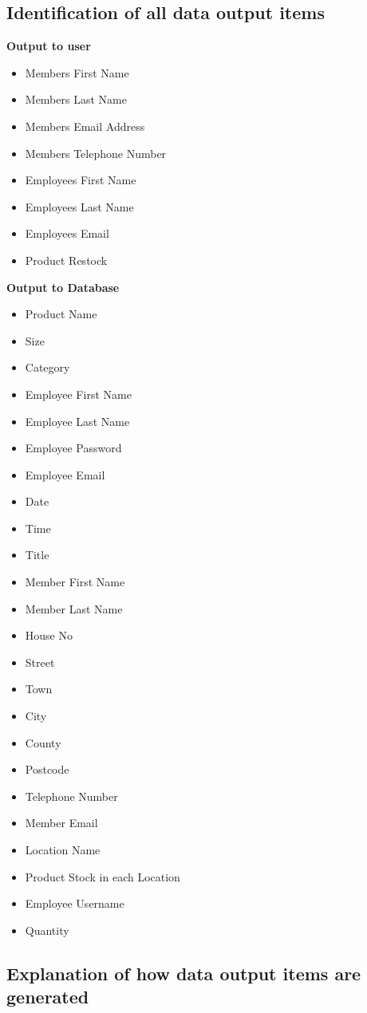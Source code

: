 \begin{python}
\pagebreak

\subsection{Identification of all data output items}

\textbf{Output to user}
\begin{itemize}
\item Members First Name
\item Members Last Name
\item Members Email Address
\item Members Telephone Number
\item Employees First Name
\item Employees Last Name
\item Employees Email
\item Product Restock
\end{itemize}

\textbf{Output to Database}
\begin{itemize}
\item Product Name
\item Size
\item Category
\item Employee First Name
\item Employee Last Name
\item Employee Password
\item Employee Email
\item Date
\item Time
\item Title
\item Member First Name
\item Member Last Name
\item House No
\item Street
\item Town
\item City
\item County
\item Postcode
\item Telephone Number
\item Member Email
\item Location Name
\item Product Stock in each Location
\item Employee Username
\item Quantity
\end{itemize}
\subsection{Explanation of how data output items are generated}


\end{python}
